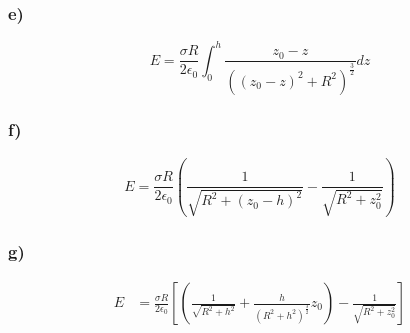 \documentclass[../homework.tex]{subfiles}
\begin{document}
\subsubsection*{e)}
\begin{equation*}
    E = \frac{\sigma R}{2\epsilon_0} \int_{0}^{h} \frac{z_0 - z}{((z_0-z)^2 + R^2)^\frac{3}{2}} dz
\end{equation*}
\subsubsection*{f)}
\begin{equation*}
    E = \frac{\sigma R}{2\epsilon_0} \left(
    \frac{1}{\sqrt{R^2 + (z_0 - h)^2}} - \frac{1}{\sqrt{R^2 + z_0^2}}
    \right)
\end{equation*}
\subsubsection*{g)}
\begin{align*}
    E & = \frac{\sigma R}{2\epsilon_0} \left[
        \left(
        \frac{1}{\sqrt{R^2 + h^2}} + \frac{h}{(R^2 + h^2)^\frac{3}{2}}z_0
        \right)
        - \frac{1}{\sqrt{R^2 + z_0^2}}
        \right]                               \\
\end{align*}
\end{document}
